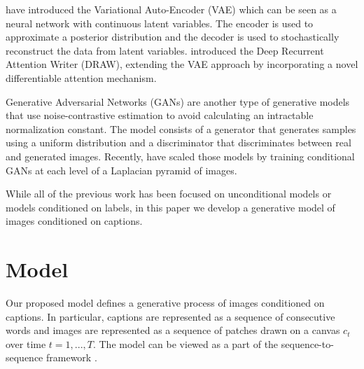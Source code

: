 \documentclass{article} %
\newcommand{\icaption}{{\bf{y}}}
\newcommand{\oimage}{{\bf{x}}}
\begin{document}
\cite{kingma_vae} have introduced the Variational Auto-Encoder (VAE) which can be seen as a neural network with continuous latent variables. The encoder is used to approximate a posterior distribution and the decoder is used to stochastically reconstruct the data from latent variables. 
\cite{gregor_draw} introduced the Deep Recurrent Attention Writer (DRAW), extending the VAE approach by incorporating a novel differentiable attention mechanism.

Generative Adversarial Networks (GANs) \citep{goodfellow_gan} are another type of generative models that use noise-contrastive estimation \citep{gutmann_nce} to avoid calculating an intractable normalization constant. The model consists of a generator that generates samples using a uniform distribution and a discriminator that discriminates between real and generated images. 
Recently, \cite{denton_lapgan} have scaled those models by training conditional GANs at each level of a Laplacian pyramid of images. 

While all of the previous work has been focused on unconditional models or models conditioned on labels, %
in this paper we develop a generative model of images conditioned on captions.

\section{Model}
\vspace{-0.1in}
\label{sec:model}
Our proposed model 
defines a generative process of images conditioned on captions. In particular, captions are represented as a sequence of consecutive words and images are represented as a sequence of patches drawn on a canvas $c_t$ over time $t=1,...,T$. The model can be viewed as a part of the sequence-to-sequence framework \citep{ilya_mt,cho_mt,nitish_video}.
\end{document}
